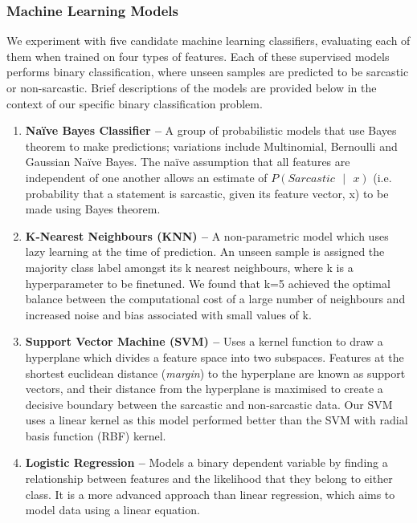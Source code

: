 \documentclass[12pt,a4paper]{article}
\begin{document}
\subsubsection{Machine Learning Models}
We experiment with five candidate machine learning classifiers, evaluating each of them when trained on four types of features. Each of these supervised models performs binary classification, where unseen samples are predicted to be sarcastic or non-sarcastic. Brief descriptions of the models are provided below in the context of our specific binary classification problem. \vspace{-3pt}

\begin{enumerate}
	\item \textbf{Na\"{i}ve Bayes Classifier --} A group of probabilistic models that use Bayes theorem to make predictions; variations include Multinomial, Bernoulli and Gaussian Na\"{i}ve Bayes. The na\"{i}ve assumption that all features are independent of one another allows an estimate of ${P(Sarcastic \text{ }| \text{ }x)}$ (i.e. probability that a statement is sarcastic, given its feature vector, x) to be made using Bayes theorem.\vspace{-3pt}
	
	\item \textbf{K-Nearest Neighbours (KNN) --} A non-parametric model which uses lazy learning at the time of prediction. An unseen sample is assigned the majority class label amongst its k nearest neighbours, where k is a hyperparameter to be finetuned. We found that k=5 achieved the optimal balance between the computational cost of a large number of neighbours and increased noise and bias associated with small values of k.\vspace{-3pt}
	
	\item \textbf{Support Vector Machine (SVM) --} Uses a kernel function to draw a hyperplane which divides a feature space into two subspaces. Features at the shortest euclidean distance (\textit{margin}) to the hyperplane are known as support vectors, and their distance from the hyperplane is maximised to create a decisive boundary between the sarcastic and non-sarcastic data. Our SVM uses a linear kernel as this model performed better than the SVM with radial basis function (RBF) kernel.\vspace{-3pt}

	\item \textbf{Logistic Regression --} Models a binary dependent variable by finding a relationship between features and the likelihood that they belong to either class. It is a more advanced approach than linear regression, which aims to model data using a linear equation.\vspace{-3pt}


\end{enumerate}
\end{document}
